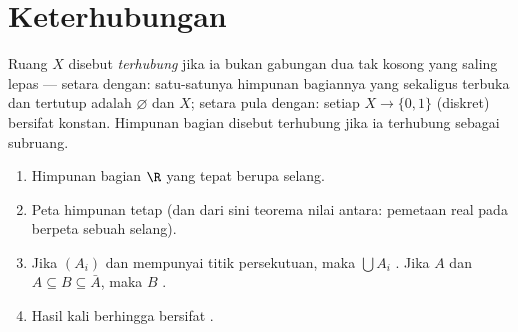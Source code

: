 \section{Keterhubungan}

\begin{definition}\label{def:b3:topology:connected}
Ruang $X$ disebut \emph{terhubung} jika ia bukan
gabungan dua  tak kosong yang saling lepas --- setara dengan:
satu-satunya himpunan bagiannya yang sekaligus terbuka dan tertutup adalah $\varnothing$ dan $X$;
setara pula dengan: setiap  $X \to \{0, 1\}$ (diskret)
bersifat konstan. Himpunan bagian disebut terhubung jika ia terhubung sebagai subruang.
\end{definition}

\begin{theorem}\label{thm:b3:topology:connectedbasics}
\begin{enumerate}
  \item Himpunan bagian $\R$ yang  tepat berupa selang.
  \item Peta  himpunan  tetap  (dan dari sini
        teorema nilai antara: pemetaan real  pada
         berpeta sebuah selang).
  \item Jika $(A_i)$  dan mempunyai titik persekutuan, maka $\bigcup
        A_i$ . Jika $A$  dan $A \subseteq
        B \subseteq \bar A$, maka $B$ .
  \item Hasil kali berhingga  bersifat .
\end{enumerate}
\end{theorem}


